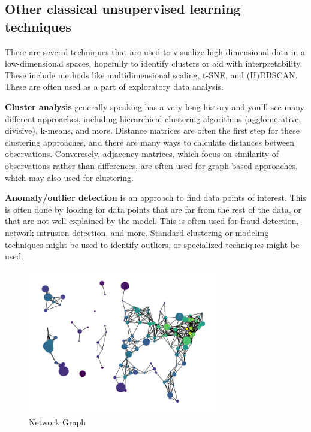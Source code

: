 \documentclass[
  letterpaper,
]{krantz}
\begin{document}
\subsection{Other classical unsupervised learning
techniques}\label{other-classical-unsupervised-learning-techniques}

There are several techniques that are used to visualize high-dimensional
data in a low-dimensional spaces, hopefully to identify clusters or aid
with interpretability. These include methods like multidimensional
scaling, t-SNE, and (H)DBSCAN. These are often used as a part of
exploratory data analysis.

\textbf{Cluster analysis} generally speaking has a very long history and
you'll see many different approaches, including hierarchical clustering
algorithms (agglomerative, divisive), k-means, and more. Distance
matrices are often the first step for these clustering approaches, and
there are many ways to calculate distances between observations.
Converesely, adjacency matrices, which focus on similarity of
observations rather than differences, are often used for graph-based
approaches, which may also used for clustering.

\textbf{Anomaly/outlier detection} is an approach to find data points of
interest. This is often done by looking for data points that are far
from the rest of the data, or that are not well explained by the model.
This is often used for fraud detection, network intrusion detection, and
more. Standard clustering or modeling techniques might be used to
identify outliers, or specialized techniques might be used.

\begin{figure}

{\centering \includegraphics[width=0.75\textwidth,height=\textheight]{img/network_us.png}

}

\caption{\label{fig-network-graph}Network Graph}

\end{figure}
\end{document}
